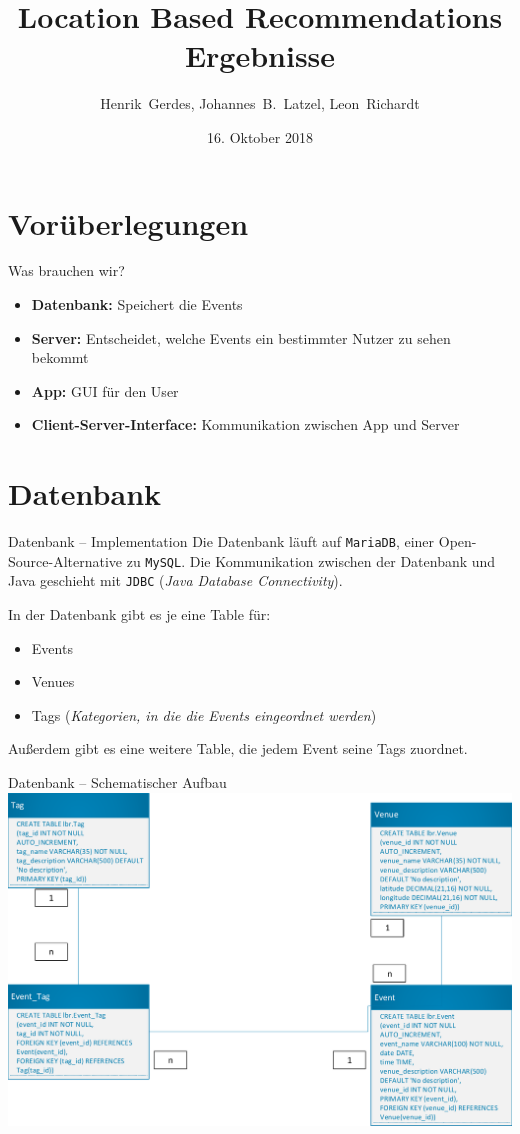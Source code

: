 \documentclass{beamer}
\title{Location Based Recommendations\\Ergebnisse}
\author[H.~Gerdes, J.B.~Latzel, L.~Richardt]{Henrik~Gerdes, Johannes~B.~Latzel, Leon~Richardt}
\institute{Universität Osnabrück}
\date[16.10.2018]{16. Oktober 2018}
\begin{document}
	
	\begin{frame}
		\titlepage
	\end{frame}

	\section{Vorüberlegungen}
	\begin{frame}{Was brauchen wir?}
			\begin{itemize}
				\item \textbf{Datenbank:} Speichert die Events
				\item \textbf{Server:} Entscheidet, welche Events ein bestimmter Nutzer zu sehen bekommt
				\item \textbf{App:} GUI für den User
				\item \textbf{Client-Server-Interface:} Kommunikation zwischen App und Server
			\end{itemize}
	\end{frame}

	\section{Datenbank}
	\begin{frame}{Datenbank -- Implementation}
		Die Datenbank läuft auf \alert{\texttt{MariaDB}}, einer Open-Source-Alternative zu \texttt{MySQL}. Die Kommunikation zwischen der Datenbank und Java geschieht mit \alert{\texttt{JDBC}} (\textit{Java Database Connectivity}).
		
		\pause
		In der Datenbank gibt es je eine Table für:
		\begin{itemize}
			\item Events
			\item Venues
			\item Tags (\textit{Kategorien, in die die Events eingeordnet werden})
		\end{itemize}
		Außerdem gibt es eine weitere Table, die jedem Event seine Tags zuordnet.
		
	\end{frame}

	\begin{frame}{Datenbank -- Schematischer Aufbau}
		\centering\includegraphics[scale=0.5]{db_scheme}
	\end{frame}
\end{document}
